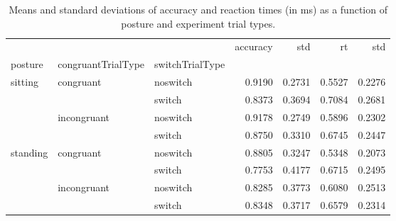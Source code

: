 \begin{table}
\centering
\caption{Means and standard deviations of accuracy and reaction times (in ms) as a function of posture and experiment trial types.}
\label{table-task-switching-replication-reaction-time}
\begin{tabular}{lllrrrr}
\toprule
         &             &        & accuracy &    std &     rt &    std \\
posture & congruantTrialType & switchTrialType &          &        &        &        \\
\midrule
sitting & congruant & noswitch &   0.9190 & 0.2731 & 0.5527 & 0.2276 \\
         &             & switch &   0.8373 & 0.3694 & 0.7084 & 0.2681 \\
         & incongruant & noswitch &   0.9178 & 0.2749 & 0.5896 & 0.2302 \\
         &             & switch &   0.8750 & 0.3310 & 0.6745 & 0.2447 \\
standing & congruant & noswitch &   0.8805 & 0.3247 & 0.5348 & 0.2073 \\
         &             & switch &   0.7753 & 0.4177 & 0.6715 & 0.2495 \\
         & incongruant & noswitch &   0.8285 & 0.3773 & 0.6080 & 0.2513 \\
         &             & switch &   0.8348 & 0.3717 & 0.6579 & 0.2314 \\
\bottomrule
\end{tabular}
\end{table}
